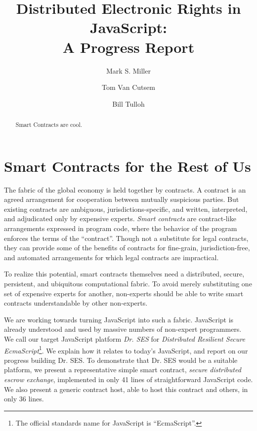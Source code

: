 \documentclass{llncs}
\begin{document}
\sloppypar


\title{Distributed Electronic Rights in JavaScript:\\
A Progress Report}

\author{Mark S. Miller \and Tom Van Cutsem \and Bill Tulloh }


\maketitle    

\begin{abstract}

Smart Contracts are cool. 

\end{abstract}

\section{Smart Contracts for the Rest of Us}

The fabric of the global economy is held together by contracts. A contract is an agreed arrangement for cooperation between mutually suspicious parties. But existing contracts are ambiguous, jurisdictions-specific, and written, interpreted, and adjudicated only by expensive experts. \emph{Smart contracts} are contract-like arrangements expressed in program code, where the behavior of the program enforces the terms of the ``contract''\cite{szabo1997formalizing}. Though not a substitute for legal contracts, they can provide some of the benefits of contracts for fine-grain, jurisdiction-free, and automated arrangements for which legal contracts are impractical.

To realize this potential, smart contracts themselves need a distributed, secure, persistent, and ubiquitous computational fabric. To avoid merely substituting one set of expensive experts for another, non-experts should be able to write smart contracts understandable by other non-experts.

We are working towards turning JavaScript into such a fabric. JavaScript is already understood and used by massive numbers of non-expert programmers. We call our target JavaScript platform \emph{Dr. SES} for \emph{Distributed Resilient Secure EcmaScript}\footnote{The official standards name for JavaScript is ``EcmaScript''.}. We explain how it relates to today's JavaScript, and report on our progress building Dr. SES. To demonstrate that Dr. SES would be a suitable platform, we present a representative simple smart contract, \emph{secure distributed escrow exchange}, implemented in only 41 lines of straightforward JavaScript code. We also present a generic contract host, able to host this contract and others, in only 36 lines.
\end{document}
